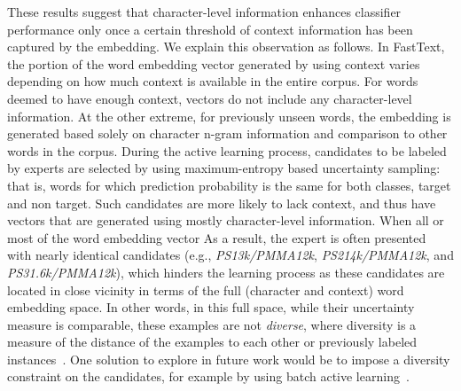 These results suggest that character-level information enhances classifier performance only once a certain threshold of context information has been captured by the embedding.
We explain this observation as follows. 
In FastText, the portion of the word embedding vector generated by using context varies depending on how much context is available in the entire corpus. 
For words deemed to have enough context, vectors do not include any character-level information. 
At the other extreme, for previously unseen words, the embedding is generated based solely on character n-gram information and comparison to other words in the corpus.
During the active learning process, candidates to be labeled by experts are selected by using maximum-entropy based uncertainty sampling: that is, words for which prediction probability is the same for both classes, target and non target.
Such candidates are more likely to lack context,
and thus have vectors that are generated using mostly character-level information.
When all or most of the word embedding vector 
As a result, the expert is often presented with nearly identical candidates (e.g., \textit{PS13k/PMMA12k}, \textit{PS214k/PMMA12k}, and \textit{PS31.6k/PMMA12k}), which hinders the learning process as these candidates are located in close vicinity in terms of the full (character and context) word embedding space.
In other words, in this full space, while their uncertainty measure is comparable, these examples are not \textit{diverse}, where diversity is a measure of the distance of the examples to each other or previously labeled instances~\cite{brinker2003incorporating}.
One solution to explore in future work would be to impose a diversity constraint on the candidates,
for example by using batch active learning~\cite{settles2009active}.


